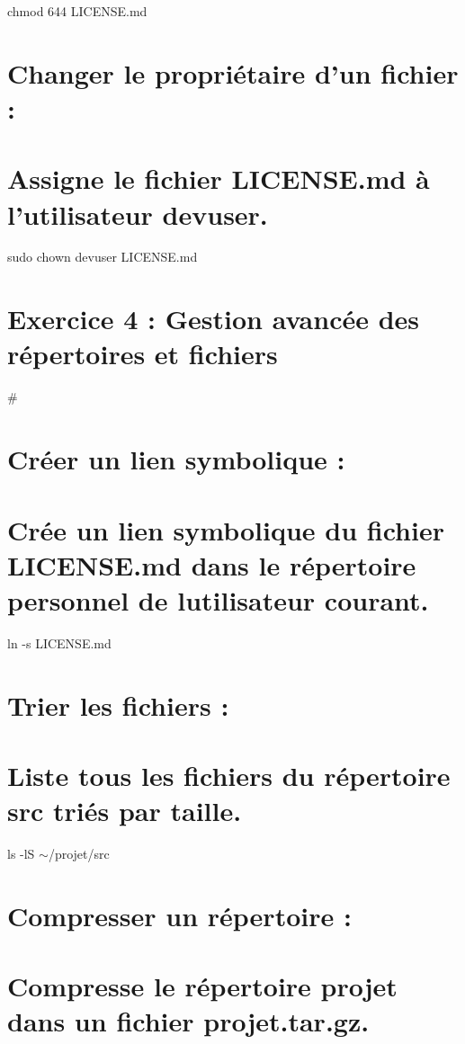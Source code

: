 chmod 644 L\+I\+C\+E\+N\+S\+E.\+md \section*{Changer le propriétaire d’un fichier \+:}

\section*{Assigne le fichier L\+I\+C\+E\+N\+S\+E.\+md à l’utilisateur devuser.}

sudo chown devuser L\+I\+C\+E\+N\+S\+E.\+md

\section*{Exercice 4 \+: Gestion avancée des répertoires et fichiers}

\# \section*{Créer un lien symbolique \+:}

\section*{Crée un lien symbolique du fichier L\+I\+C\+E\+N\+S\+E.\+md dans le répertoire personnel de l\textquotesingle{}utilisateur courant.}

ln -\/s L\+I\+C\+E\+N\+S\+E.\+md

\section*{Trier les fichiers \+:}

\section*{Liste tous les fichiers du répertoire src triés par taille.}

ls -\/lS $\sim$/projet/src

\section*{Compresser un répertoire \+:}

\section*{Compresse le répertoire projet dans un fichier projet.\+tar.\+gz.}

